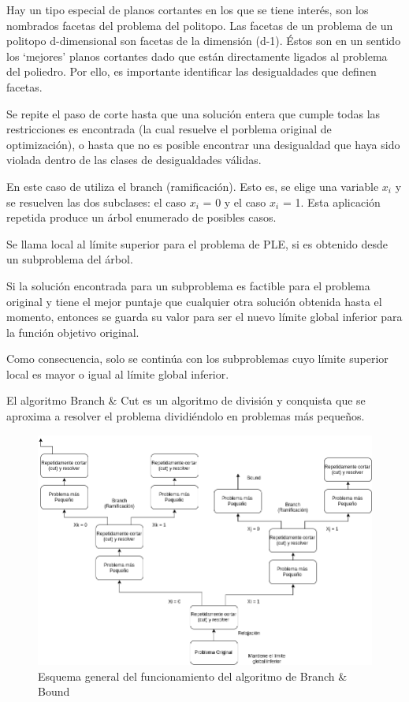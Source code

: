 \documentclass[a4paper]{article}
\begin{document}
Hay un tipo especial de planos cortantes en los que se tiene interés, son los nombrados facetas del problema del politopo. Las facetas de un problema de un politopo d-dimensional son facetas de la dimensión (d-1). Éstos son en un sentido los `mejores' planos cortantes  dado que están directamente ligados al problema del poliedro. Por ello, es importante identificar las desigualdades que definen facetas.\newline

Se repite el paso de corte hasta que una solución entera que cumple todas las restricciones es encontrada (la cual resuelve el porblema original de optimización), o hasta que  no es posible encontrar una desigualdad que haya sido violada dentro de las clases de desigualdades válidas.

En este caso de utiliza el branch (ramificación). Esto es, se elige una variable $x_i$ y se resuelven las dos subclases: el caso $x_i$ = 0 y el caso $x_i$ = 1. Esta aplicación repetida produce un árbol enumerado de posibles casos.

Se llama local al límite superior para el problema de PLE, si es obtenido desde un subproblema del árbol.

Si la solución encontrada para un subproblema es factible para el problema original  y tiene el mejor puntaje que cualquier otra solución obtenida hasta el momento, entonces se guarda su valor para ser el nuevo límite global inferior para la función objetivo original.

Como consecuencia, solo se continúa con los subproblemas cuyo límite superior local es mayor o igual al límite global inferior.

El algoritmo Branch \& Cut es un algoritmo de división y conquista que se aproxima a  resolver el problema  dividiéndolo en problemas más pequeños.

\begin{figure}[H]
\centering
\includegraphics[scale=0.4]{Imagenes/diagrama_branch_and_bound.png}\par
\caption{Esquema general del funcionamiento del algoritmo de Branch \& Bound}
\end{figure}
\end{document}
